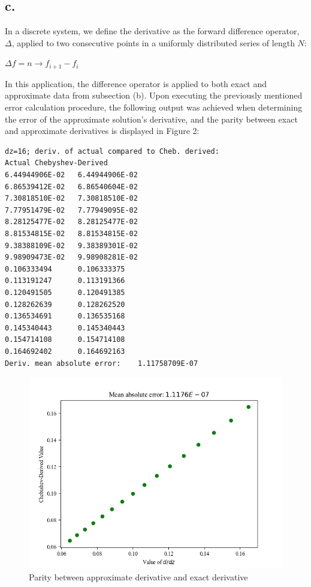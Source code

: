 \documentclass{report}
\begin{document}
\subsection*{c.}

	In a discrete system, we define the derivative as the forward difference operator, $\Delta$, applied to two consecutive points in a uniformly distributed series of length $N$:
	
	\begin{center}
		
		$\Delta f = n \rightarrow f_{i + 1} - f_i$
		
	\end{center}

	\noindent In this application, the difference operator is applied to both exact and approximate data from subsection (b). Upon executing the previously mentioned error calculation procedure, the following output was achieved when determining the error of the approximate solution's derivative, and the parity between exact and approximate derivatives is displayed in Figure 2:
	
	\begin{lstlisting}
dz=16; deriv. of actual compared to Cheb. derived:
Actual Chebyshev-Derived
6.44944906E-02   6.44944906E-02
6.86539412E-02   6.86540604E-02
7.30818510E-02   7.30818510E-02
7.77951479E-02   7.77949095E-02
8.28125477E-02   8.28125477E-02
8.81534815E-02   8.81534815E-02
9.38388109E-02   9.38389301E-02
9.98909473E-02   9.98908281E-02
0.106333494      0.106333375    
0.113191247      0.113191366    
0.120491505      0.120491385    
0.128262639      0.128262520    
0.136534691      0.136535168    
0.145340443      0.145340443    
0.154714108      0.154714108    
0.164692402      0.164692163    
Deriv. mean absolute error:    1.11758709E-07
	\end{lstlisting}

	\begin{figure}[!ht]
		\centering
		\includegraphics[scale=0.7]{figures/results_partc.png}
		\caption{Parity between approximate derivative and exact derivative}
	\end{figure}
\end{document}
